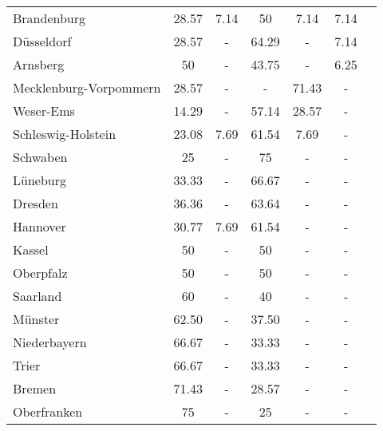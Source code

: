 \begin{table}[H]
\begin{tabularx}{\textwidth}{Xcccccc}
            Brandenburg & 28.57 & 7.14 & 50 & 7.14 & 7.14 \\
            Düsseldorf & 28.57 & - & 64.29 & - & 7.14 \\
            Arnsberg & 50 & - & 43.75 & - & 6.25 \\
            Mecklenburg-Vorpommern & 28.57 & - & - & 71.43 & - \\
            Weser-Ems & 14.29 & - & 57.14 & 28.57 & - \\
            Schleswig-Holstein & 23.08 & 7.69 & 61.54 & 7.69 & - \\
            Schwaben & 25 & - & 75 & - & - \\
            Lüneburg & 33.33 & - & 66.67 & - & - \\
            Dresden & 36.36 & - & 63.64 & - & - \\
            Hannover & 30.77 & 7.69 & 61.54 & - & - \\
            Kassel & 50 & - & 50 & - & - \\
            Oberpfalz & 50 & - & 50 & - & - \\
            Saarland & 60 & - & 40 & - & - \\
            Münster & 62.50 & - & 37.50 & - & - \\
            Niederbayern & 66.67 & - & 33.33 & - & - \\
            Trier & 66.67 & - & 33.33 & - & - \\
            Bremen & 71.43 & - & 28.57 & - & - \\
            Oberfranken & 75 & - & 25 & - & - \\
        \bottomrule
    \end{tabularx}
\end{table}
        